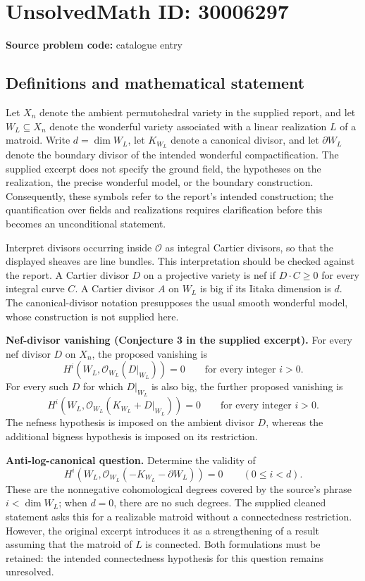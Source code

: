 \documentclass[11pt]{article}
\begin{document}
\section*{UnsolvedMath ID: 30006297}
\textbf{Source problem code:} catalogue entry
\subsection{Definitions and mathematical statement}
Let \(X_n\) denote the ambient permutohedral variety in the supplied report, and let \(W_L\subseteq X_n\) denote the wonderful variety associated with a linear realization \(L\) of a matroid. Write \(d=\dim W_L\), let \(K_{W_L}\) denote a canonical divisor, and let \(\partial W_L\) denote the boundary divisor of the intended wonderful compactification. The supplied excerpt does not specify the ground field, the hypotheses on the realization, the precise wonderful model, or the boundary construction. Consequently, these symbols refer to the report's intended construction; the quantification over fields and realizations requires clarification before this becomes an unconditional statement.

Interpret divisors occurring inside \(\mathcal O\) as integral Cartier divisors, so that the displayed sheaves are line bundles. This interpretation should be checked against the report. A Cartier divisor \(D\) on a projective variety is nef if \(D\cdot C\geq 0\) for every integral curve \(C\). A Cartier divisor \(A\) on \(W_L\) is big if its Iitaka dimension is \(d\). The canonical-divisor notation presupposes the usual smooth wonderful model, whose construction is not supplied here.

\textbf{Nef-divisor vanishing (Conjecture 3 in the supplied excerpt).} For every nef divisor \(D\) on \(X_n\), the proposed vanishing is
\[
H^i\!\left(W_L,\mathcal O_{W_L}(D|_{W_L})\right)=0
\qquad\text{for every integer }i>0.
\]
For every such \(D\) for which \(D|_{W_L}\) is also big, the further proposed vanishing is
\[
H^i\!\left(W_L,\mathcal O_{W_L}(K_{W_L}+D|_{W_L})\right)=0
\qquad\text{for every integer }i>0.
\]
The nefness hypothesis is imposed on the ambient divisor \(D\), whereas the additional bigness hypothesis is imposed on its restriction.

\textbf{Anti-log-canonical question.} Determine the validity of
\[
H^i\!\left(W_L,\mathcal O_{W_L}(-K_{W_L}-\partial W_L)\right)=0
\qquad(0\leq i<d).
\]
These are the nonnegative cohomological degrees covered by the source's phrase \(i<\dim W_L\); when \(d=0\), there are no such degrees. The supplied cleaned statement asks this for a realizable matroid without a connectedness restriction. However, the original excerpt introduces it as a strengthening of a result assuming that the matroid of \(L\) is connected. Both formulations must be retained: the intended connectedness hypothesis for this question remains unresolved.
\end{document}
